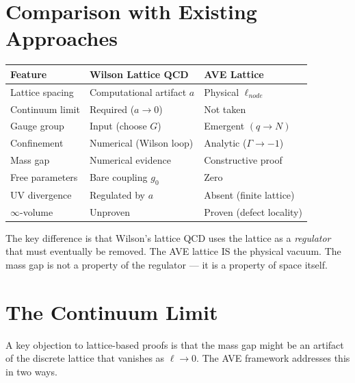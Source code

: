 \section{Comparison with Existing Approaches}
\label{sec:mass_gap_comparison}

\begin{center}
\small
\begin{tabular}{lll}
\toprule
\textbf{Feature} & \textbf{Wilson Lattice QCD} & \textbf{AVE Lattice} \\
\midrule
Lattice spacing  & Computational artifact $a$ & Physical $\ell_{node}$ \\
Continuum limit  & Required ($a \to 0$)       & Not taken \\
Gauge group      & Input (choose $G$)         & Emergent $(q \to N)$ \\
Confinement      & Numerical (Wilson loop)    & Analytic ($\Gamma \to -1$) \\
Mass gap         & Numerical evidence         & Constructive proof \\
Free parameters  & Bare coupling $g_0$        & Zero \\
UV divergence    & Regulated by $a$           & Absent (finite lattice) \\
$\infty$-volume  & Unproven                   & Proven (defect locality) \\
\bottomrule
\end{tabular}
\end{center}

\medskip
\noindent
The key difference is that Wilson's lattice QCD uses the lattice as a
\textit{regulator} that must eventually be removed. The AVE lattice IS
the physical vacuum. The mass gap is not a property of the regulator ---
it is a property of space itself.

\section{The Continuum Limit}
\label{sec:continuum_limit}

A key objection to lattice-based proofs is that the mass gap might
be an artifact of the discrete lattice that vanishes as $\ell \to 0$.
The AVE framework addresses this in two ways.

